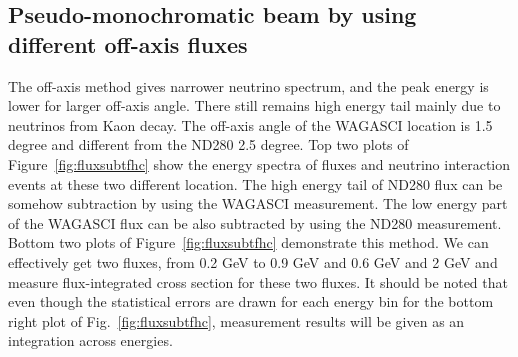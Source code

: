 


\subsection{Pseudo-monochromatic beam by using different off-axis fluxes}
The off-axis method gives narrower neutrino spectrum, and the peak energy is lower for larger off-axis angle.
There still remains high energy tail mainly due to neutrinos from Kaon decay.
The off-axis angle of the WAGASCI location is 1.5 degree and different from the ND280 2.5 degree.
Top two plots of Figure~\ref{fig:fluxsubtfhc} show the energy spectra of fluxes and neutrino interaction events
at these two different location.
The high energy tail of ND280 flux can be somehow subtraction by using the WAGASCI measurement.
The low energy part of the WAGASCI flux can be also subtracted by using the ND280 measurement.
Bottom two plots of Figure~\ref{fig:fluxsubtfhc} demonstrate this method.
We can effectively get two fluxes, from 0.2 GeV to 0.9 GeV and 0.6 GeV and 2 GeV
and measure flux-integrated cross section for these two fluxes.
It should be noted that even though the statistical errors are drawn for each energy bin for the bottom right plot of Fig.~\ref{fig:fluxsubtfhc},
measurement results will be given as an integration across energies.

